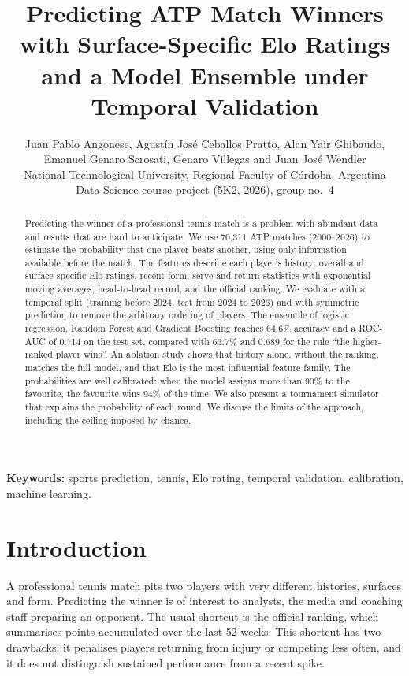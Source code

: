 \documentclass[11pt,a4paper]{article}
\title{\textbf{Predicting ATP Match Winners with Surface-Specific Elo Ratings\\and a Model Ensemble under Temporal Validation}}
\author{
  Juan Pablo Angonese, Agustín José Ceballos Pratto, Alan Yair Ghibaudo,\\
  Emanuel Genaro Scrosati, Genaro Villegas and Juan José Wendler\\[4pt]
  \small National Technological University, Regional Faculty of Córdoba, Argentina\\
  \small Data Science course project (5K2, 2026), group no.~4
}
\date{}
\begin{document}
\maketitle

\begin{abstract}
Predicting the winner of a professional tennis match is a problem with abundant data and results that are hard to anticipate. We use 70,311 ATP matches (2000--2026) to estimate the probability that one player beats another, using only information available before the match. The features describe each player's history: overall and surface-specific Elo ratings, recent form, serve and return statistics with exponential moving averages, head-to-head record, and the official ranking. We evaluate with a temporal split (training before 2024, test from 2024 to 2026) and with symmetric prediction to remove the arbitrary ordering of players. The ensemble of logistic regression, Random Forest and Gradient Boosting reaches 64.6\% accuracy and a ROC-AUC of 0.714 on the test set, compared with 63.7\% and 0.689 for the rule ``the higher-ranked player wins''. An ablation study shows that history alone, without the ranking, matches the full model, and that Elo is the most influential feature family. The probabilities are well calibrated: when the model assigns more than 90\% to the favourite, the favourite wins 94\% of the time. We also present a tournament simulator that explains the probability of each round. We discuss the limits of the approach, including the ceiling imposed by chance.
\end{abstract}

\noindent\textbf{Keywords:} sports prediction, tennis, Elo rating, temporal validation, calibration, machine learning.

\section{Introduction}

A professional tennis match pits two players with very different histories, surfaces and form. Predicting the winner is of interest to analysts, the media and coaching staff preparing an opponent. The usual shortcut is the official ranking, which summarises points accumulated over the last 52 weeks. This shortcut has two drawbacks: it penalises players returning from injury or competing less often, and it does not distinguish sustained performance from a recent spike.
\end{document}
